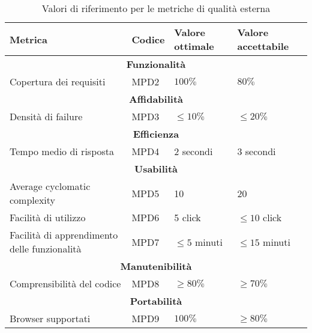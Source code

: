\begin{table}[H]
    \centering
    \begin{tabularx}{\textwidth}{p{5.5cm}|X|l|l}
        \hline
        \textbf{Metrica} & \textbf{Codice}   & \textbf{Valore ottimale}  & \textbf{Valore accettabile}   \\
        \hline
        \multicolumn{4}{c}{\textbf{Funzionalità}} \\
        \hline
        Copertura dei requisiti & MPD2 &  $100\%$ & $80\%$    \\
        \hline
        \multicolumn{4}{c}{\textbf{Affidabilità}} \\
        \hline
        Densità di failure & MPD3 & $\le 10\%$ & $\le 20\% $ \\
        \hline
        \multicolumn{4}{c}{\textbf{Efficienza}} \\
        \hline
        Tempo medio di risposta & MPD4 & 2 secondi & 3 secondi \\
        \hline
        \multicolumn{4}{c}{\textbf{Usabilità}} \\
        \hline
        Average cyclomatic complexity & MPD5 & 10 & 20 \\
        Facilità di utilizzo & MPD6 & 5 click & $\le 10$ click \\
        Facilità di apprendimento delle funzionalità & MPD7 & $\le 5$ minuti & $\le 15$ minuti \\
        \hline
        \multicolumn{4}{c}{\textbf{Manutenibilità}} \\
        \hline
        Comprensibilità del codice & MPD8 & $\ge 80\%$ & $\ge 70\%$ \\
        \hline
        \multicolumn{4}{c}{\textbf{Portabilità}} \\
        \hline
        Browser supportati & MPD9 & $100\%$ & $\ge 80\%$ \\
        \hline
    \end{tabularx}
    \caption{Valori di riferimento per le metriche di qualità esterna}
\end{table}